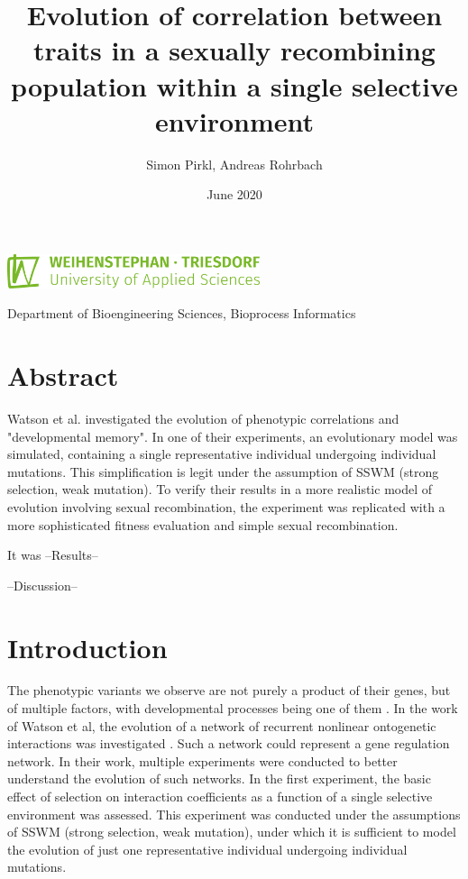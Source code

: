 \documentclass{article}
\title{Evolution of correlation between traits in a sexually recombining population within a single selective environment}
\date{June 2020}
\author{Simon Pirkl, Andreas Rohrbach}
\begin{document}
\maketitle

\begin{center}
	\includegraphics[height=10mm]{./img/ci/HSWT_Logo_gruen.png}

	\vspace{5mm}
	Department of Bioengineering Sciences, Bioprocess Informatics
\end{center}


\tableofcontents
\newpage

\section{Abstract}

Watson et al. investigated the evolution of phenotypic correlations and "developmental memory". In one of their experiments, an evolutionary model was simulated, containing a single representative individual undergoing individual mutations. This simplification is legit under the assumption of SSWM (strong selection, weak mutation). 
To verify their results in a more realistic model of evolution involving sexual recombination, the experiment was replicated with a more sophisticated fitness evaluation and simple sexual recombination.

It was --Results--

--Discussion--

\section{Introduction}

The phenotypic variants we observe are not purely a product of their genes, but of multiple factors, with developmental processes being one of them \cite{laland2015}. In the work of Watson et al, the evolution of a network of recurrent nonlinear ontogenetic interactions was investigated \cite{watson2014}. Such a network could represent a gene regulation network. In their work, multiple experiments were conducted to better understand the evolution of such networks. In the first experiment, the basic effect of selection on interaction coefficients as a function of a single selective environment was assessed. This experiment was conducted under the assumptions of SSWM (strong selection, weak mutation), under which it is sufficient to model the evolution of just one representative individual undergoing individual mutations. 
\end{document}
